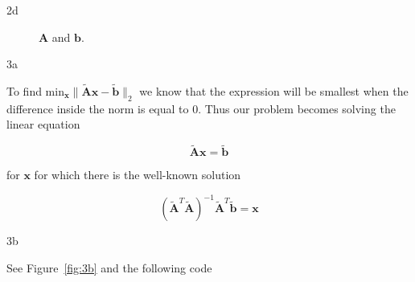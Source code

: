 \documentclass{article}
\begin{document}
\begin{homeworkProblem}
\begin{homeworkSection}{2d}
\begin{figure}[!ht]
\begin{centering}
            \caption{\label{fig:2d} $\bm{A}$ and $\bm{b}$.}

        \end{centering}
        \end{figure}

    \end{homeworkSection}

\end{homeworkProblem}

\begin{homeworkProblem}

    \begin{homeworkSection}{3a}

        To find min$_{\bm{x}} \|\tilde{\bm{A}}\bm{x} - \tilde{\bm{b}}\|_2$ we
        know that the expression will be smallest when the difference inside
        the norm is equal to 0. Thus our problem becomes solving the linear
        equation

        \begin{equation*}
            \tilde{\bm{A}}\bm{x} = \tilde{\bm{b}}
        \end{equation*}

        \noindent for $\bm{x}$ for which there is the well-known solution

        \begin{equation*} 
            (\tilde{\bm{A}}^T \tilde{\bm{A}})^{-1}
            \tilde{\bm{A}}^T \tilde{\bm{b}} = \bm{x}
        \end{equation*}

    \end{homeworkSection}

    \begin{homeworkSection}{3b}
       
        See Figure~\ref{fig:3b} and the following code


\end{homeworkSection}
\end{homeworkProblem}
\end{document}
